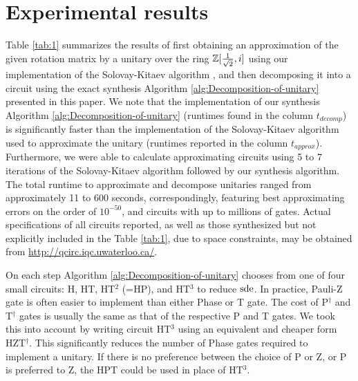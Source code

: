\documentclass[english,journal]{extarticle}
\theoremstyle{plain}
\theoremstyle{plain}
\theoremstyle{plain}
\theoremstyle{definition}
\theoremstyle{plain}
\theoremstyle{plain}
\begin{document}
\section{Experimental results} 
\noindent
Table \ref{tab:1} summarizes the results of first obtaining an
approximation of the given rotation matrix by a unitary over the ring $\mathbb{Z}[\frac{1}{\sqrt{2}},i]$
using our implementation of the Solovay-Kitaev algorithm \cite{Dawson2008, K1},
and then decomposing it into a circuit using the exact synthesis Algorithm
\ref{alg:Decomposition-of-unitary} presented in this paper.  We note that the 
implementation of our synthesis Algorithm \ref{alg:Decomposition-of-unitary} (runtimes found in the column $t_{decomp}$) 
is significantly faster than the implementation of the Solovay-Kitaev algorithm used to approximate the unitary (runtimes reported in the column $t_{approx}$). 
Furthermore, we were able to calculate approximating 
circuits using 5 to 7 iterations of the Solovay-Kitaev algorithm followed by our synthesis algorithm.  The total runtime to approximate and decompose unitaries
ranged from approximately 11 to 600 seconds, correspondingly, featuring best approximating errors on the order of $10^{-50}$, 
and circuits with up to millions of gates.  Actual specifications of all circuits reported, as well as those synthesized but not explicitly 
included in the Table \ref{tab:1}, due to space constraints, may be obtained from \url{http://qcirc.iqc.uwaterloo.ca/}. 

On each step Algorithm \ref{alg:Decomposition-of-unitary} chooses from one of four small circuits: H, HT, HT$^2$ (=HP), and HT$^3$ to reduce $\mathrm{sde}$.  In 
practice, Pauli-Z gate is often easier to implement than either Phase or T gate.  The cost of P$^{\dagger}$ and T$^{\dagger}$ gates is usually the same as that of the respective P and T gates.  
We took this into account by writing circuit HT$^3$ using an equivalent and cheaper form HZT$^{\dagger}$.  This significantly reduces the number of Phase gates required to implement a unitary. 
If there is no preference between the choice of P or Z, or P is preferred to Z, the HPT could be used in place of HT$^3$.
\end{document}
